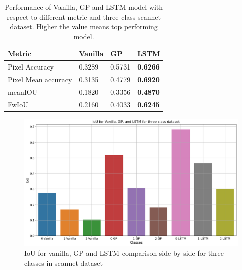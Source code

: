 	\begin{table}[h]
		\begin{center}
			\begin{tabular}{ | l | l | l | p{4cm} |}
				\hline
				
				\cellcolor{purple!30}Metric & \cellcolor{purple!30}Vanilla & \cellcolor{purple!30}GP & \cellcolor{purple!30}LSTM\\ \hline
				Pixel Accuracy & 0.3289 & 0.5731 & {\bf 0.6266} \\ \hline
				Pixel Mean accuracy & 0.3135 & 0.4779 & {\bf 0.6920} \\ \hline
				meanIOU & 0.1820 & 0.3356 & {\bf 0.4870} \\ \hline
				FwIoU & 0.2160 & 0.4033 & {\bf 0.6245} \\ \hline
				\hline
			\end{tabular}
			\caption{Performance of Vanilla, GP and LSTM model with respect to different metric and three class scannet dataset. Higher the value means top performing model.}
			\label{table:unet_scannet_three_classes}
		\end{center}
	\end{table}	

	\begin{figure}
		\centering
		\includegraphics[width=12cm]{images/IoU_v_g_l_three_classes.png}
		\caption{IoU for vanilla, GP and LSTM comparison side by side for three classes in scannet dataset}
		\label{fig:performance_metric_three_classes_unet}
	\end{figure}
	

